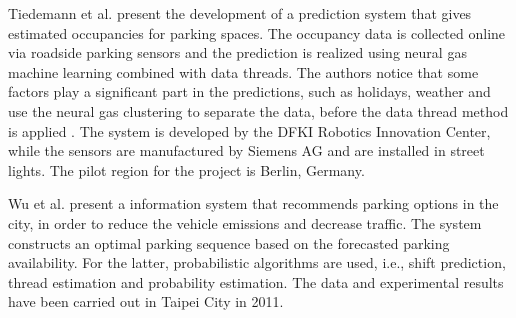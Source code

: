 
Tiedemann et al. \cite{tiedemann} present the development of a prediction system that gives estimated occupancies for parking spaces. The occupancy data is collected online via roadside parking sensors and the prediction is realized using neural gas machine learning combined with data threads. The authors notice that some factors play a significant part in the predictions, such as holidays, weather and use the neural gas clustering to separate the data, before the data thread method is applied
. The system is developed by the DFKI Robotics Innovation Center, while the sensors are manufactured by Siemens AG and are installed in street lights. The pilot region for the project is Berlin, Germany.


Wu et al. \cite{wu} present a information system that recommends parking options in the city, in order to reduce the vehicle emissions and decrease traffic. The system constructs an optimal parking sequence based on the forecasted parking availability. For the latter, probabilistic algorithms are used, i.e., shift prediction, thread estimation and probability estimation. The data and experimental results have been carried out in Taipei City in 2011.

